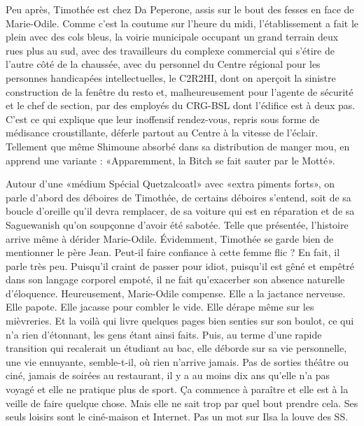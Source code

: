 Peu après, Timothée est chez Da Peperone, assis sur le bout des fesses en face de Marie-Odile. Comme c’est la coutume sur l’heure du midi, l’établissement a fait le plein avec des cols bleus, la voirie municipale occupant un grand terrain deux rues plus au sud, avec des travailleurs du complexe commercial qui s’étire de l’autre côté de la chaussée, avec du personnel du Centre régional pour les personnes handicapées intellectuelles, le C2R2HI, dont on aperçoit la sinistre construction de la fenêtre du resto et, malheureusement pour l’agente de sécurité et le chef de section, par des employés du CRG-BSL dont l’édifice est à deux pas. C’est ce qui explique que leur inoffensif rendez-vous, repris sous forme de médisance croustillante, déferle partout au Centre à la vitesse de l’éclair. Tellement que même Shimoune absorbé dans sa distribution de manger mou, en apprend une variante : «Apparemment, la Bitch se fait sauter par le Motté».

Autour d’une «médium Spécial Quetzalcoatl» avec «extra piments forts», on parle d’abord des déboires de Timothée, de certains déboires s’entend, soit de sa boucle d’oreille qu’il devra remplacer, de sa voiture qui est en réparation et de sa Saguewanish qu’on soupçonne d’avoir été sabotée. Telle que présentée, l’histoire arrive même à dérider Marie-Odile. Évidemment, Timothée se garde bien de mentionner le père Jean. Peut-il faire confiance à cette femme flic ? En fait, il parle très peu. Puisqu’il craint de passer pour idiot, puisqu’il est gêné et empêtré dans son langage corporel empoté, il ne fait qu’exacerber son absence naturelle d’éloquence. Heureusement, Marie-Odile compense. Elle a la jactance nerveuse. Elle papote. Elle jacasse pour combler le vide. Elle dérape même sur les mièvreries. Et la voilà qui livre quelques pages bien senties sur son boulot, ce qui n’a rien d’étonnant, les gens étant ainsi faits. Puis, au terme d’une rapide transition qui recalerait un étudiant au bac, elle déborde sur sa vie personnelle, une vie ennuyante, semble-t-il, où rien n’arrive jamais. Pas de sorties théâtre ou ciné, jamais de soirées au restaurant, il y a au moins dix ans qu’elle n’a pas voyagé et elle ne pratique plus de sport. Ça commence à paraître et elle est à la veille de faire quelque chose. Mais elle ne sait trop par quel bout prendre cela. Ses seuls loisirs sont le ciné-maison et Internet. Pas un mot sur Ilsa la louve des SS.

